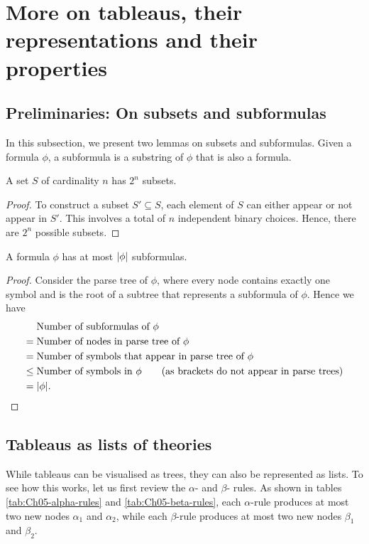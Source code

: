 \section{More on tableaus, their representations and their properties}

\subsection{Preliminaries: On subsets and subformulas}

In this subsection, we present two lemmas on subsets and subformulas. Given a formula \(\phi\), a subformula is a substring of \(\phi\) that is also a formula.

\begin{lemma}
    A set \(S\) of cardinality \(n\) has \(2^n\) subsets.
\end{lemma}
\begin{proof}
    To construct a subset \(S' \subseteq S\), each element of \(S\) can either appear or not appear in \(S'\). This involves a total of \(n\) independent binary choices. Hence, there are \(2^n\) possible subsets.
\end{proof}

\begin{lemma}
    A formula \(\phi\) has at most \(|\phi|\) subformulas.
\end{lemma}
\begin{proof}
    Consider the parse tree of \(\phi\), where every node contains exactly one symbol and is the root of a subtree that represents a subformula of \(\phi\). Hence we have
    \begin{align*}
        & \text{Number of subformulas of } \phi\\
        =\;& \text{Number of nodes in parse tree of } \phi\\
        =\;& \text{Number of symbols that appear in parse tree of } \phi\\
        \leq\;& \text{Number of symbols in } \phi \tag{as brackets do not appear in parse trees}\\
        =\;& |\phi|\text{.} \qedhere
    \end{align*}
\end{proof}

\subsection{Tableaus as lists of theories}

While tableaus can be visualised as trees, they can also be represented as lists. To see how this works, let us first review the \(\alpha\)- and \(\beta\)- rules. As shown in tables \ref{tab:Ch05-alpha-rules} and \ref{tab:Ch05-beta-rules}, each \(\alpha\)-rule produces at most two new nodes \(\alpha_1\) and \(\alpha_2\), while each \(\beta\)-rule produces at most two new nodes \(\beta_1\) and \(\beta_2\).

